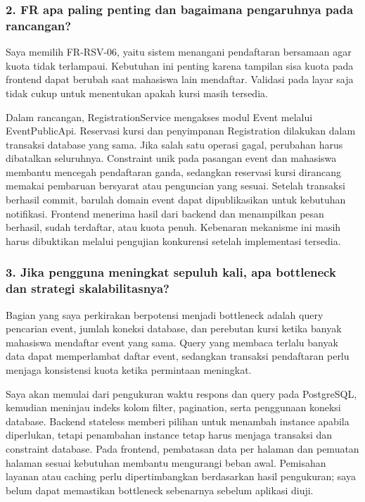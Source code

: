 \documentclass[11pt,a4paper]{article}
\begin{document}
\subsubsection*{2. FR apa paling penting dan bagaimana pengaruhnya pada rancangan?}
Saya memilih FR-RSV-06, yaitu sistem menangani pendaftaran bersamaan agar kuota tidak terlampaui. Kebutuhan ini penting karena tampilan sisa kuota pada frontend dapat berubah saat mahasiswa lain mendaftar. Validasi pada layar saja tidak cukup untuk menentukan apakah kursi masih tersedia.

Dalam rancangan, RegistrationService mengakses modul Event melalui EventPublicApi. Reservasi kursi dan penyimpanan Registration dilakukan dalam transaksi database yang sama. Jika salah satu operasi gagal, perubahan harus dibatalkan seluruhnya. Constraint unik pada pasangan event dan mahasiswa membantu mencegah pendaftaran ganda, sedangkan reservasi kursi dirancang memakai pembaruan bersyarat atau penguncian yang sesuai. Setelah transaksi berhasil commit, barulah domain event dapat dipublikasikan untuk kebutuhan notifikasi. Frontend menerima hasil dari backend dan menampilkan pesan berhasil, sudah terdaftar, atau kuota penuh. Kebenaran mekanisme ini masih harus dibuktikan melalui pengujian konkurensi setelah implementasi tersedia.

\subsubsection*{3. Jika pengguna meningkat sepuluh kali, apa bottleneck dan strategi skalabilitasnya?}
Bagian yang saya perkirakan berpotensi menjadi bottleneck adalah query pencarian event, jumlah koneksi database, dan perebutan kursi ketika banyak mahasiswa mendaftar event yang sama. Query yang membaca terlalu banyak data dapat memperlambat daftar event, sedangkan transaksi pendaftaran perlu menjaga konsistensi kuota ketika permintaan meningkat.

Saya akan memulai dari pengukuran waktu respons dan query pada PostgreSQL, kemudian meninjau indeks kolom filter, pagination, serta penggunaan koneksi database. Backend stateless memberi pilihan untuk menambah instance apabila diperlukan, tetapi penambahan instance tetap harus menjaga transaksi dan constraint database. Pada frontend, pembatasan data per halaman dan pemuatan halaman sesuai kebutuhan membantu mengurangi beban awal. Pemisahan layanan atau caching perlu dipertimbangkan berdasarkan hasil pengukuran; saya belum dapat memastikan bottleneck sebenarnya sebelum aplikasi diuji.
\end{document}
